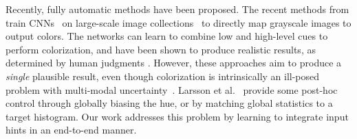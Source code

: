 \documentclass[acmtog,authorversion]{acmart}
\begin{document}
Recently, fully automatic methods \cite{deshpande2015learning,cheng2015deep,iizuka2016let,zhang2016colorful,larsson2016learning,isola2016image} have been proposed. The recent methods from train CNNs~\cite{lecun1998gradient} on large-scale image collections~\cite{russakovsky2015imagenet,zhou2014learning} to directly map grayscale images to output colors. The networks can learn to combine low and high-level cues to perform colorization, and have been shown to produce realistic results, as determined by human judgments \cite{zhang2016colorful}. However, these approaches aim to produce a \textit{single} plausible result, even though colorization is intrinsically an ill-posed problem with multi-modal uncertainty~\cite{charpiat2008automatic}. Larsson et al.~ provide some post-hoc control through globally biasing the hue, or by matching global statistics to a target histogram. Our work addresses this problem by learning to integrate input hints in an end-to-end manner.
\end{document}
